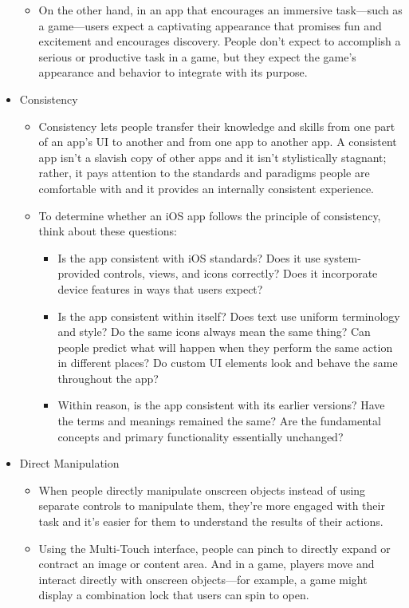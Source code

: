 \begin{itemize}
\begin{itemize}
	\newpage
	\item On the other hand, in an app that encourages an immersive task—such as a game—users expect a captivating appearance that promises fun and excitement and encourages discovery. People don’t expect to accomplish a serious or productive task in a game, but they expect the game’s appearance and behavior to integrate with its purpose.
	\end{itemize}
\item Consistency
	\begin{itemize}
	\item Consistency lets people transfer their knowledge and skills from one part of an app’s UI to another and from one app to another app. A consistent app isn’t a slavish copy of other apps and it isn’t stylistically stagnant; rather, it pays attention to the standards and paradigms people are comfortable with and it provides an internally consistent experience. 
	\item To determine whether an iOS app follows the principle of consistency, think about these questions:
		\begin{itemize}
		\item Is the app consistent with iOS standards? Does it use system-provided controls, views, and icons correctly? Does it incorporate device features in ways that users expect?
		\item Is the app consistent within itself? Does text use uniform terminology and style? Do the same icons always mean the same thing? Can people predict what will happen when they perform the same action in different places? Do custom UI elements look and behave the same throughout the app?
		\item Within reason, is the app consistent with its earlier versions? Have the terms and meanings remained the same? Are the fundamental concepts and primary functionality essentially unchanged?
		\end{itemize}
	\end{itemize}
\item Direct Manipulation
	\begin{itemize}
	\item When people directly manipulate onscreen objects instead of using separate controls to manipulate them, they're more engaged with their task and it’s easier for them to understand the results of their actions. 
	\item Using the Multi-Touch interface, people can pinch to directly expand or contract an image or content area. And in a game, players move and interact directly with onscreen objects—for example, a game might display a combination lock that users can spin to open. 


\end{itemize}
\end{itemize}
